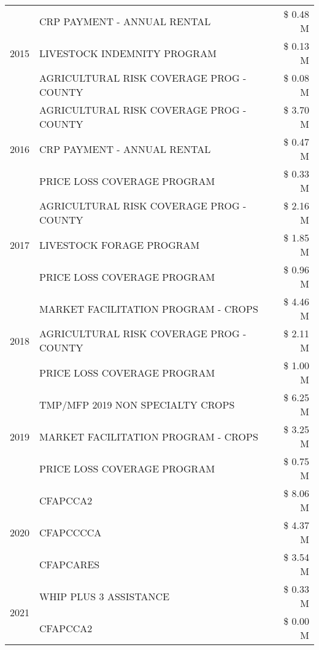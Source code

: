 \begin{tabular}{llr}
\cline{1-3}
\multirow[t]{3}{*}{2015} & CRP PAYMENT - ANNUAL RENTAL & \$ 0.48 M \\
 & LIVESTOCK INDEMNITY PROGRAM & \$ 0.13 M \\
 & AGRICULTURAL RISK COVERAGE PROG - COUNTY & \$ 0.08 M \\
\cline{1-3}
\multirow[t]{3}{*}{2016} & AGRICULTURAL RISK COVERAGE PROG - COUNTY & \$ 3.70 M \\
 & CRP PAYMENT - ANNUAL RENTAL & \$ 0.47 M \\
 & PRICE LOSS COVERAGE PROGRAM & \$ 0.33 M \\
\cline{1-3}
\multirow[t]{3}{*}{2017} & AGRICULTURAL RISK COVERAGE PROG - COUNTY & \$ 2.16 M \\
 & LIVESTOCK FORAGE PROGRAM & \$ 1.85 M \\
 & PRICE LOSS COVERAGE PROGRAM & \$ 0.96 M \\
\cline{1-3}
\multirow[t]{3}{*}{2018} & MARKET FACILITATION PROGRAM - CROPS & \$ 4.46 M \\
 & AGRICULTURAL RISK COVERAGE PROG - COUNTY & \$ 2.11 M \\
 & PRICE LOSS COVERAGE PROGRAM & \$ 1.00 M \\
\cline{1-3}
\multirow[t]{3}{*}{2019} & TMP/MFP 2019 NON SPECIALTY CROPS & \$ 6.25 M \\
 & MARKET FACILITATION PROGRAM - CROPS & \$ 3.25 M \\
 & PRICE LOSS COVERAGE PROGRAM & \$ 0.75 M \\
\cline{1-3}
\multirow[t]{3}{*}{2020} & CFAPCCA2 & \$ 8.06 M \\
 & CFAPCCCCA & \$ 4.37 M \\
 & CFAPCARES & \$ 3.54 M \\
\cline{1-3}
\multirow[t]{2}{*}{2021} & WHIP PLUS 3 ASSISTANCE & \$ 0.33 M \\
 & CFAPCCA2 & \$ 0.00 M \\
\cline{1-3}
\bottomrule
\end{tabular}
